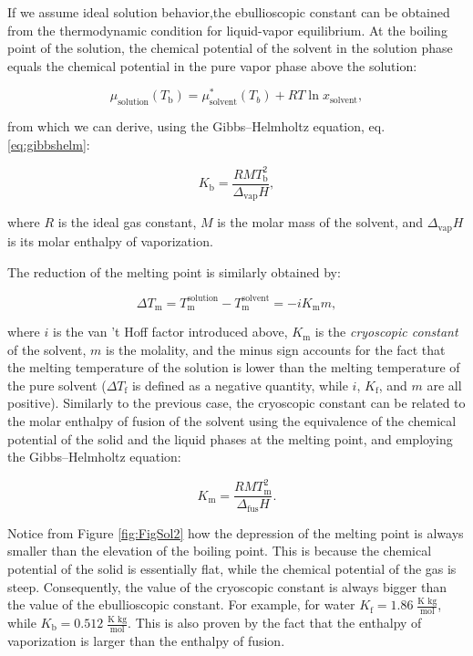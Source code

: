 \documentclass[
  9pt,
]{extbook}
\theoremstyle{definition}
\theoremstyle{definition}
\theoremstyle{definition}
\theoremstyle{remark}
\begin{document}
If we assume ideal solution behavior,the ebullioscopic constant can be obtained from the thermodynamic condition for liquid-vapor equilibrium. At the boiling point of the solution, the chemical potential of the solvent in the solution phase equals the chemical potential in the pure vapor phase above the solution:

\begin{equation}
\mu_{\text{solution}} (T_{\text{b}})  = \mu_{\text{solvent}}^*(T_b)  + RT\ln x_{\text{solvent}},
\label{eq:coll4}
\end{equation}

from which we can derive, using the Gibbs--Helmholtz equation, eq. \eqref{eq:gibbshelm}:

\begin{equation}
K_{\text{b}}=\frac{RMT_{\text{b}}^{2}}{\Delta_{\mathrm{vap}} H},
\label{eq:coll5}
\end{equation}

where \(R\) is the ideal gas constant, \(M\) is the molar mass of the solvent, and \(\Delta_{\mathrm{vap}} H\) is its molar enthalpy of vaporization.

The reduction of the melting point is similarly obtained by:

\begin{equation}
\Delta T_{\text{m}}=T_{\text{m}}^{\text{solution}}-T_{\text{m}}^{\text{solvent}}=-iK_{\text{m}}m,
\label{eq:coll6}
\end{equation}

where \(i\) is the van 't Hoff factor introduced above, \(K_{\text{m}}\) is the \emph{cryoscopic constant} of the solvent, \(m\) is the molality, and the minus sign accounts for the fact that the melting temperature of the solution is lower than the melting temperature of the pure solvent (\(\Delta T_{\text{f}}\) is defined as a negative quantity, while \(i\), \(K_{\text{f}}\), and \(m\) are all positive). Similarly to the previous case, the cryoscopic constant can be related to the molar enthalpy of fusion of the solvent using the equivalence of the chemical potential of the solid and the liquid phases at the melting point, and employing the Gibbs--Helmholtz equation:

\begin{equation}
K_{\text{m}}=\frac{RMT_{\text{m}}^{2}}{\Delta_{\mathrm{fus}}H}.
\label{eq:coll7}
\end{equation}

Notice from Figure \ref{fig:FigSol2} how the depression of the melting point is always smaller than the elevation of the boiling point. This is because the chemical potential of the solid is essentially flat, while the chemical potential of the gas is steep. Consequently, the value of the cryoscopic constant is always bigger than the value of the ebullioscopic constant. For example, for water \(K_{\text{f}} = 1.86\; \frac{\text{K kg}}{\text{mol}}\), while \(K_{\text{b}} = 0.512\; \frac{\text{K kg}}{\text{mol}}\). This is also proven by the fact that the enthalpy of vaporization is larger than the enthalpy of fusion.
\end{document}
